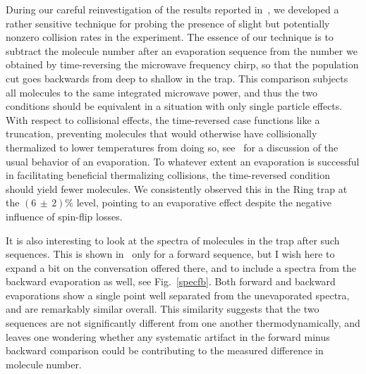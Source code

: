 During our careful reinvestigation of the results reported in~\cite{Stuhl2012evap}, we developed a rather sensitive technique for probing the presence of slight but potentially nonzero collision rates in the experiment.
The essence of our technique is to subtract the molecule number after an evaporation sequence from the number we obtained by time-reversing the  microwave frequency chirp, so that the population cut goes backwards from deep to shallow in the trap.
This comparison subjects all molecules to the same integrated microwave power, and thus the two conditions should be equivalent in a situation with only single particle effects.
With respect to collisional effects, the time-reversed case functions like a truncation, preventing molecules that would otherwise have collisionally thermalized to lower temperatures from doing so, see~\cite{Luiten1996} for a discussion of the usual behavior of an evaporation.
To whatever extent an evaporation is successful in facilitating beneficial thermalizing collisions, the time-reversed condition should yield fewer molecules.
We consistently observed this in the Ring trap at the $(6\,{\pm}\,2)\%$ level, pointing to an evaporative effect despite the negative influence of spin-flip losses.

It is also interesting to look at the spectra of molecules in the trap after such sequences. 
This is shown in~\citep[App.~B]{Reens2017} only for a forward sequence, but I wish here to expand a bit on the conversation offered there, and to include a spectra from the backward evaporation as well, see Fig.~\ref{specfb}.
Both forward and backward evaporations show a single point well separated from the unevaporated spectra, and are remarkably similar overall.
This similarity suggests that the two sequences are not significantly different from one another thermodynamically, and leaves one wondering whether any systematic artifact in the forward minus backward comparison could be contributing to the measured difference in molecule number.

